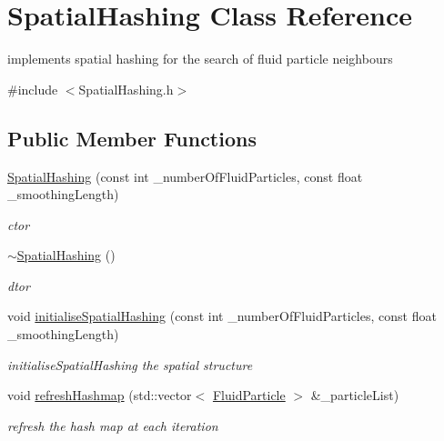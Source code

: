 \hypertarget{class_spatial_hashing}{
\section{SpatialHashing Class Reference}
\label{class_spatial_hashing}
}


implements spatial hashing for the search of fluid particle neighbours  




{\ttfamily \#include $<$SpatialHashing.h$>$}

\subsection*{Public Member Functions}
\begin{DoxyCompactItemize}
\item 
\hyperlink{class_spatial_hashing_a98c165ee367f6fbd6a755bcdd46e0d98}{SpatialHashing} (const int \_\-numberOfFluidParticles, const float \_\-smoothingLength)
\begin{DoxyCompactList}\small\item\em ctor \item\end{DoxyCompactList}\item 
\hyperlink{class_spatial_hashing_a5799e4a0ffdbd11c5202aa13d15dc313}{$\sim$SpatialHashing} ()
\begin{DoxyCompactList}\small\item\em dtor \item\end{DoxyCompactList}\item 
void \hyperlink{class_spatial_hashing_aeb15873f735e15a7b3fa8d3cc211db93}{initialiseSpatialHashing} (const int \_\-numberOfFluidParticles, const float \_\-smoothingLength)
\begin{DoxyCompactList}\small\item\em initialiseSpatialHashing the spatial structure \item\end{DoxyCompactList}\item 
void \hyperlink{class_spatial_hashing_acd1b87ec8ea289a18d431b7a3fde50c0}{refreshHashmap} (std::vector$<$ \hyperlink{class_fluid_particle}{FluidParticle} $>$ \&\_\-particleList)
\begin{DoxyCompactList}\small\item\em refresh the hash map at each iteration \item\end{DoxyCompactList}\item 

\end{DoxyCompactItemize}
